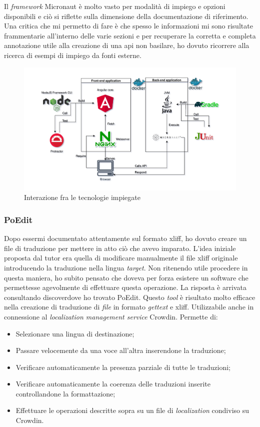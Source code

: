 Il \textit{framework} Micronaut è molto vasto per modalità di impiego e opzioni disponibili e ciò si riflette sulla dimensione della documentazione di riferimento.
Una critica che mi permetto di fare è che spesso le informazioni mi sono risultate frammentarie all'interno delle varie sezioni e per recuperare la corretta e completa annotazione utile alla creazione di una \acrshort{api} non basilare, ho dovuto ricorrere alla ricerca di esempi di impiego da fonti esterne.
\begin{figure}[H]
    \centering
    \includegraphics[width=\columnwidth]{immagini/Network scheme-2.png}
    \caption{Interazione fra le tecnologie impiegate}
    \label{fig:techInteraction}
\end{figure}
\subsubsection{PoEdit}
Dopo essermi documentato attentamente sul formato \acrshort{xliff}, ho dovuto creare un file di traduzione per mettere in atto ciò che avevo imparato. L'idea iniziale proposta dal tutor era quella di modificare manualmente il file \acrshort{xliff} originale introducendo la traduzione nella lingua \textit{target}. Non ritenendo utile procedere in questa maniera, ho subito pensato che doveva per forza esistere un software che permettesse agevolmente di effettuare questa operazione. La risposta è arrivata consultando \gls{discover}\glsfirstoccur dove ho trovato PoEdit.
Questo \textit{tool} è risultato molto efficace nella creazione di traduzione di \textit{file} in formato \emph{gettext} e \acrshort{xliff}. Utilizzabile anche in connessione al \textit{localization management service} Crowdin. Permette di:
\begin{itemize}
    \item Selezionare una lingua di destinazione;
    \item Passare velocemente da una voce all'altra inserendone la traduzione;
    \item Verificare automaticamente la presenza parziale di tutte le traduzioni;
    \item Verificare automaticamente la coerenza delle traduzioni inserite controllandone la formattazione;
    \item Effettuare le operazioni descritte sopra su un file di \textit{localization} condiviso su Crowdin.
\end{itemize}
\newpage
